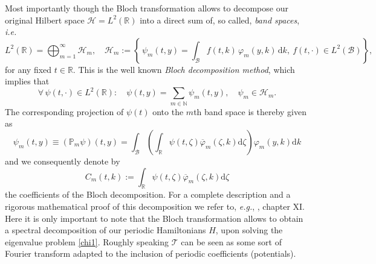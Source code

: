 \documentclass[leqno,final]{siamltex}
\numberwithin{equation}{section}
\newcounter{me}
\begin{document}
Most importantly though the Bloch transformation allows to
decompose our original Hilbert space $\mathcal H=L^2({{\mathbb R}})$ into a
direct sum of, so called, \emph{band spaces}, {{\sl i.e.\/ }} \begin{equation} L^2({{\mathbb R}})=
\bigoplus_{m=1}^\infty \mathcal H_m, \quad \mathcal H_m:=\left
\{\,  \psi_m(t,y)= \int_\mathcal B f(t,k) \, {\varphi}_m(y,k) \, {{\mathrm {d}}} k, \
f(t, \cdot)\in L^2(\mathcal B) \right\}, \end{equation} for any fixed $t\in
{{\mathbb R}}$. This is the well known \emph{Bloch decomposition method},
which implies that \begin{equation}\label{sum} \forall \, \psi(t, \cdot)\in
L^2({{\mathbb R}}):\quad \psi(t,y)=\sum_{m\in {{\mathbb N }}} \psi_m(t,y), \quad \psi_m
\in \mathcal H_m. \end{equation} The corresponding projection of $\psi(t)$
onto the $m$th band space is thereby given as
\begin{equation}\label{projection} \psi_m(t,y)\equiv (\mathbb P_m \psi)(t,y)=
\int_{\mathcal B} \left(\int_{{\mathbb R}} \psi(t,\zeta)
\overline{\varphi}_m\left(\zeta ,k\right) {{\mathrm {d}}} \zeta \right)
{\varphi}_m\left(y,k\right) {{\mathrm {d}}} k \end{equation} and we consequently denote by \begin{equation}
\label{coeff} C_m(t,k):=\int_{{\mathbb R}} \psi(t,\zeta)
\overline{\varphi}_m\left(\zeta ,k\right) {{\mathrm {d}}} \zeta \end{equation} the
coefficients of the Bloch decomposition. For a complete
description and a rigorous mathematical proof of this
decomposition we refer to, {{\sl e.g.\/}}, \cite{ReSi}, chapter XI. Here it
is only important to note that the Bloch transformation allows to
obtain a spectral decomposition of our periodic Hamiltonians $H$,
upon solving the eigenvalue problem \eqref{chi1}. Roughly speaking
$\mathcal T$ can be seen as some sort of Fourier transform adapted
to the inclusion of periodic coefficients (potentials).
\end{document}

